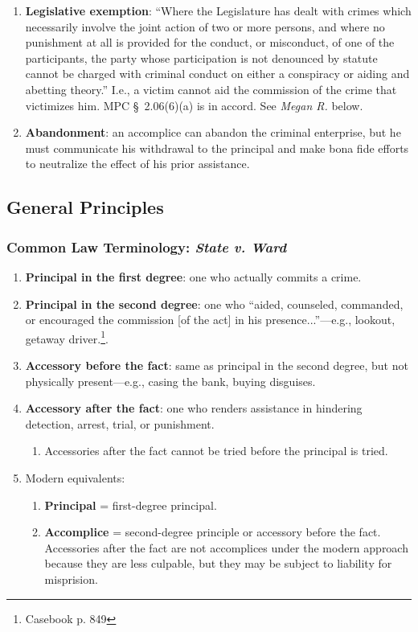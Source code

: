 \begin{enumerate}
    \item \textbf{Legislative exemption}: ``Where the Legislature has dealt 
    with crimes which necessarily involve the joint action of two or more 
    persons, and where no punishment at all is provided for the conduct, or 
    misconduct, of one of the participants, the party whose participation is 
    not denounced by statute cannot be charged with criminal conduct on either 
    a conspiracy or aiding and abetting theory.'' I.e., a victim cannot aid 
    the commission of the crime that victimizes him. MPC \S\ 2.06(6)(a) is in 
    accord. See \emph{Megan R.} below.
    \item \textbf{Abandonment}: an accomplice can abandon the criminal 
    enterprise, but he must communicate his withdrawal to the principal and 
    make bona fide efforts to neutralize the effect of his prior assistance.
\end{enumerate}

\subsection{General Principles}

\subsubsection{Common Law Terminology: \emph{State v. Ward}}

\begin{enumerate}
    \item \textbf{Principal in the first degree}: one who actually commits a 
    crime.
    \item \textbf{Principal in the second degree}: one who ``aided, counseled, 
    commanded, or encouraged the commission [of the act] in his 
    presence...''---e.g., lookout, getaway driver.\footnote{Casebook p. 849}.
    \item \textbf{Accessory before the fact}: same as principal in the second 
    degree, but not physically present---e.g., casing the bank, buying 
    disguises.
    \item \textbf{Accessory after the fact}: one who renders assistance in 
    hindering detection, arrest, trial, or punishment.
    \begin{enumerate}
        \item Accessories after the fact cannot be tried before the principal 
        is tried.
    \end{enumerate}
    \item Modern equivalents:
    \begin{enumerate}
        \item \textbf{Principal} = first-degree principal.
        \item \textbf{Accomplice} = second-degree principle or accessory 
        before the fact. Accessories after the fact are not accomplices under 
        the modern approach because they are less culpable, but they may be 
        subject to liability for misprision. %
    \end{enumerate}
\end{enumerate}

